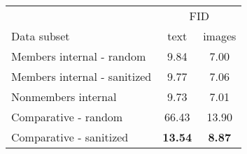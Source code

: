 \begin{tabular}{@{}lcc@{}}
    \toprule
                                 & \multicolumn{2}{c}{FID}                 \\
    Data subset                  & text                    & images        \\
    \midrule
    Members internal - random    & 9.84                    & 7.00          \\
    Members internal - sanitized & 9.77                    & 7.06          \\
    Nonmembers internal          & 9.73                    & 7.01          \\
    \midrule
    Comparative - random         & 66.43                   & 13.90         \\
    Comparative - sanitized      & \textbf{13.54}          & \textbf{8.87} \\
    \bottomrule
\end{tabular}